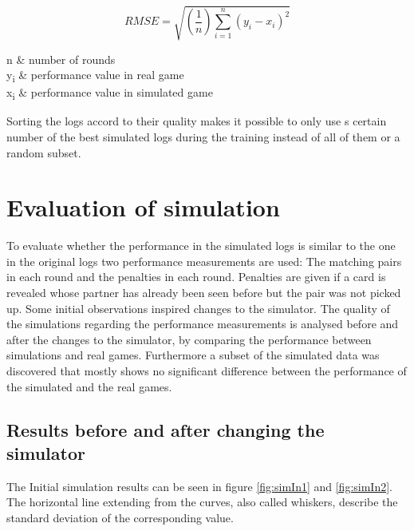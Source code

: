 \begin{minipage}{0.45\textwidth}
	\begin{equation*}
	RMSE = \sqrt{(\frac{1}{n})\sum_{i=1}^{n}(y_{i} - x_{i})^{2}}
	\end{equation*}
\end{minipage}
\begin{minipage}{0.55\textwidth}
	\begin{conditions*}
		n  &  number of rounds \\
		y\textsubscript{i}  &  performance value in real game\\
		x\textsubscript{i}  &  performance value in simulated game 
	\end{conditions*}
\end{minipage}

Sorting the logs accord to their quality makes it possible to only use s certain number of the best simulated logs during the training instead of all of them or a random subset. 

\section{Evaluation of simulation}
\label{evaluation_of_simulation}
To evaluate whether the performance in the simulated logs is similar to the one in the original logs two performance measurements are used: The matching pairs in each round and the penalties in each round. Penalties are given if a card is revealed whose partner has already been seen before but the pair was not picked up. Some initial observations inspired changes to the simulator. The quality of the simulations regarding the performance measurements is analysed before and after the changes to the simulator, by comparing the performance between simulations and real games. Furthermore a subset of the simulated data was discovered that mostly shows no significant difference between the performance of the simulated and the real games.

\subsection{Results before and after changing the simulator}
\label{results_before_and_after_changing_the_simulator}
The Initial simulation results can be seen in figure \ref{fig:simIn1} and \ref{fig:simIn2}. The horizontal line extending from the curves, also called whiskers, describe the standard deviation of the corresponding value. 


